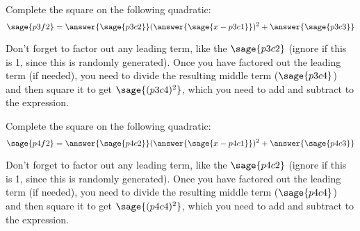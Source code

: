 \documentclass{ximera}
\begin{document}
\begin{problem}
    Complete the square on the following quadratic:
    \[
        \sage{p3f2} = \answer{\sage{p3c2}}(\answer{\sage{x-p3c1}})^2 + \answer{\sage{p3c3}}
    \]
    \begin{feedback}
        Don't forget to factor out any leading term, like the $\sage{p3c2}$ (ignore if this is 1, since this is randomly generated). Once you have factored out the leading term (if needed), you need to divide the resulting middle term ($\sage{p3c4}$) and then square it to get $\sage{(p3c4)^2}$, which you need to add and subtract to the expression.
    \end{feedback}
\end{problem}



\begin{problem}
    Complete the square on the following quadratic:
    \[
        \sage{p4f2} = \answer{\sage{p4c2}}(\answer{\sage{x-p4c1}})^2 + \answer{\sage{p4c3}}
    \]
    \begin{feedback}
        Don't forget to factor out any leading term, like the $\sage{p4c2}$ (ignore if this is 1, since this is randomly generated). Once you have factored out the leading term (if needed), you need to divide the resulting middle term ($\sage{p4c4}$) and then square it to get $\sage{(p4c4)^2}$, which you need to add and subtract to the expression.
    \end{feedback}
\end{problem}
\end{document}
